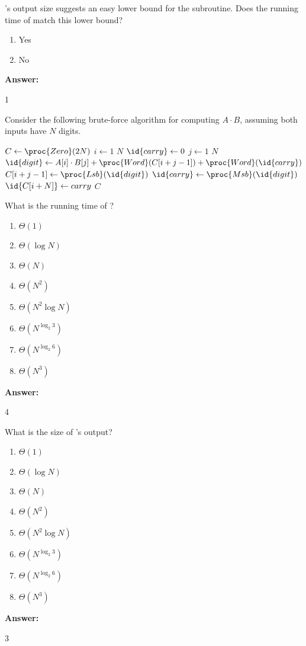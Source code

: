 \documentclass[12pt,twoside]{article}
\newcommand{\answer}{
 \par\medskip
 \textbf{Answer:}
}
\newcommand{\answerIc}{ \answer
1
}
\newcommand{\answerId}{ \answer
4
}
\newcommand{\answerIe}{ \answer
3
}
\begin{document}
\begin{problems}
\begin{problemparts}
\problempart {} 's output size suggests an easy lower bound
for the subroutine. Does the running time of  match this lower bound?
\begin{enumerate}
  \item Yes
  \item No
\end{enumerate}
\answerIc

\end{problemparts}

Consider the following brute-force algorithm for computing $A \cdot B$, assuming
both inputs have $N$ digits.

\begin{codebox}
\li $C \gets \proc{Zero}(2N)$
\li \For $i \gets 1$ \To $N$ \label{li:mul-for1}
\li   \Do
        $\id{carry} \gets 0$
\li     \For $j \gets 1$ \To $N$ \label{li:mul-for2}
\li        \Do
             $\id{digit} \gets A[i] \cdot B[j] + \proc{Word}(C[i + j - 1]) +
                               \proc{Word}(\id{carry})$
\li           $C[i + j - 1] \gets \proc{Lsb}(\id{digit})$
\li           $\id{carry} \gets \proc{Msb}(\id{digit})$
           \End
\li     $\id{C[i + N]} \gets carry$
      \End
\li \Return $C$
\end{codebox}

\begin{problemparts}
\problempart {} What is the running time of ?
\begin{enumerate}
  \item $\Theta(1)$
  \item $\Theta(\log N)$
  \item $\Theta(N)$
  \item $\Theta(N^2)$
  \item $\Theta(N^2 \log N)$
  \item $\Theta(N^{\log_2 3})$
  \item $\Theta(N^{\log_2 6})$
  \item $\Theta(N^3)$
\end{enumerate}
\answerId

\problempart {} What is the size of 's output?
\begin{enumerate}
  \item $\Theta(1)$
  \item $\Theta(\log N)$
  \item $\Theta(N)$
  \item $\Theta(N^2)$
  \item $\Theta(N^2 \log N)$
  \item $\Theta(N^{\log_2 3})$
  \item $\Theta(N^{\log_2 6})$
  \item $\Theta(N^3)$
\end{enumerate}
\answerIe


\end{problemparts}
\end{problems}
\end{document}
